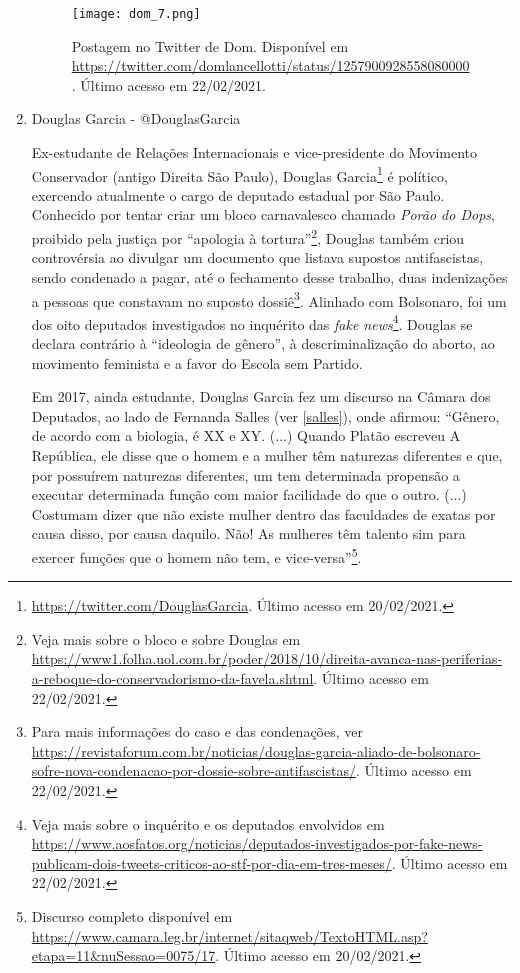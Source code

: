\documentclass[
	12pt,				%
	openright,			%
	twoside,			%
	a4paper,			%
	english,			%
	brazil				%
	]{abntex2}
\begin{document}
\begin{anexosenv}
\begin{enumerate}
 \begin{figure}[!htbp]
    \centering
    \texttt{[image: dom\_7.png]}
    \caption{Postagem no Twitter de Dom. Disponível em \url{https://twitter.com/domlancellotti/status/1257900928558080000}. Último acesso em 22/02/2021.}
 \end{figure}
 
 \item Douglas Garcia - @DouglasGarcia\label{douglasgarcia}
 
 Ex-estudante de Relações Internacionais e vice-presidente do Movimento Conservador (antigo Direita São Paulo), Douglas Garcia\footnote{\url{https://twitter.com/DouglasGarcia}. Último acesso em 20/02/2021.} é político, exercendo atualmente o cargo de deputado estadual por São Paulo. Conhecido por tentar criar um bloco carnavalesco chamado \textit{Porão do Dops}, proibido pela justiça por ``apologia à tortura''\footnote{Veja mais sobre o bloco e sobre Douglas em \url{https://www1.folha.uol.com.br/poder/2018/10/direita-avanca-nas-periferias-a-reboque-do-conservadorismo-da-favela.shtml}. Último acesso em 22/02/2021.}, Douglas também criou controvérsia ao divulgar um documento que listava supostos antifascistas, sendo condenado a pagar, até o fechamento desse trabalho, duas indenizações a pessoas que constavam no suposto dossiê\footnote{Para mais informações do caso e das condenações, ver \url{https://revistaforum.com.br/noticias/douglas-garcia-aliado-de-bolsonaro-sofre-nova-condenacao-por-dossie-sobre-antifascistas/}. Último acesso em 22/02/2021.}. Alinhado com Bolsonaro, foi um dos oito deputados investigados no inquérito das \textit{fake news}\footnote{Veja mais sobre o inquérito e os deputados envolvidos em  \url{https://www.aosfatos.org/noticias/deputados-investigados-por-fake-news-publicam-dois-tweets-criticos-ao-stf-por-dia-em-tres-meses/}. Último acesso em 22/02/2021.}. Douglas se declara contrário à ``ideologia de gênero'', à descriminalização do aborto, ao movimento feminista e a favor do Escola sem Partido. 
 
 Em 2017, ainda estudante, Douglas Garcia fez um discurso na Câmara dos Deputados, ao lado de Fernanda Salles (ver \ref{salles}), onde afirmou: ``Gênero, de acordo com a biologia, é XX e XY. (...) Quando Platão escreveu A República, ele disse que o homem e a mulher têm naturezas diferentes e que, por possuírem naturezas diferentes, um tem determinada propensão a executar determinada função com maior facilidade do que o outro. (...) Costumam dizer que não existe mulher dentro das faculdades de exatas por causa disso, por causa daquilo. Não! As mulheres têm talento sim para exercer funções que o homem não tem, e vice-versa''\footnote{Discurso completo disponível em \url{https://www.camara.leg.br/internet/sitaqweb/TextoHTML.asp?etapa=11&nuSessao=0075/17}. Último acesso em 20/02/2021.}.
 

\end{enumerate}
\end{anexosenv}
\end{document}
